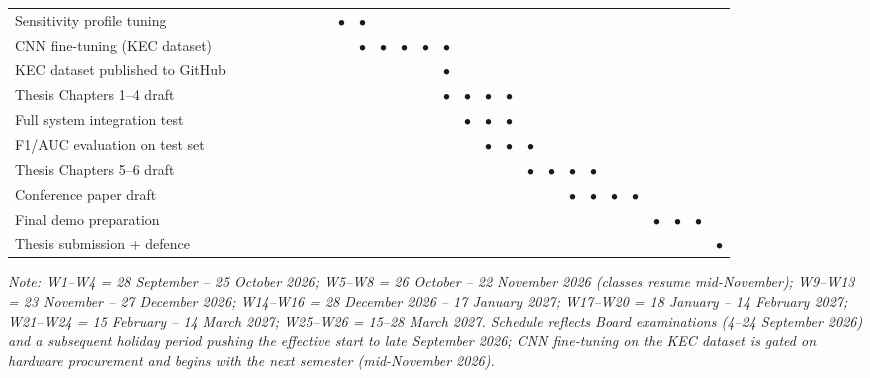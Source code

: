 \begin{table}[H]
{\begin{tabular}{l*{26}{c}}
        Sensitivity profile tuning & & & & & & & & $\bullet$ & $\bullet$ & & & & & & & & & & & & & & & & & \\
        CNN fine-tuning (KEC dataset) & & & & & & & & & $\bullet$ & $\bullet$ & $\bullet$ & $\bullet$ & $\bullet$ & & & & & & & & & & & & & \\
        KEC dataset published to GitHub & & & & & & & & & & & & & $\bullet$ & & & & & & & & & & & & & \\
        Thesis Chapters 1--4 draft & & & & & & & & & & & & & $\bullet$ & $\bullet$ & $\bullet$ & $\bullet$ & & & & & & & & & & \\
        Full system integration test & & & & & & & & & & & & & & $\bullet$ & $\bullet$ & $\bullet$ & & & & & & & & & & \\
        F1/AUC evaluation on test set & & & & & & & & & & & & & & & $\bullet$ & $\bullet$ & $\bullet$ & & & & & & & & & \\
        Thesis Chapters 5--6 draft & & & & & & & & & & & & & & & & & $\bullet$ & $\bullet$ & $\bullet$ & $\bullet$ & & & & & & \\
        Conference paper draft & & & & & & & & & & & & & & & & & & & $\bullet$ & $\bullet$ & $\bullet$ & $\bullet$ & & & & \\
        Final demo preparation & & & & & & & & & & & & & & & & & & & & & & & $\bullet$ & $\bullet$ & $\bullet$ & \\
        Thesis submission + defence & & & & & & & & & & & & & & & & & & & & & & & & & & $\bullet$ \\
        \bottomrule
    \end{tabular}%
    }
\end{table}

\textit{Note: W1--W4 = 28 September -- 25 October 2026; W5--W8 = 26 October -- 22 November 2026 (classes resume mid-November); W9--W13 = 23 November -- 27 December 2026; W14--W16 = 28 December 2026 -- 17 January 2027; W17--W20 = 18 January -- 14 February 2027; W21--W24 = 15 February -- 14 March 2027; W25--W26 = 15--28 March 2027. Schedule reflects Board examinations (4--24 September 2026) and a subsequent holiday period pushing the effective start to late September 2026; CNN fine-tuning on the KEC dataset is gated on hardware procurement and begins with the next semester (mid-November 2026).}